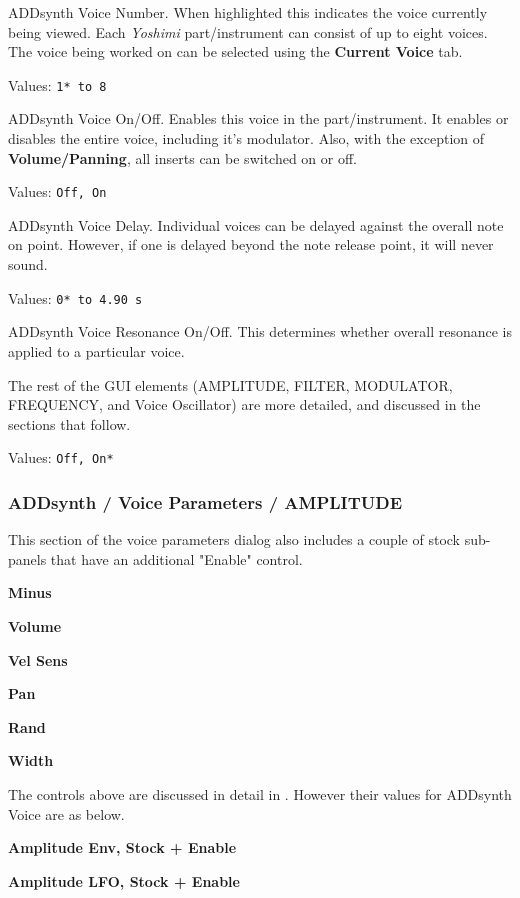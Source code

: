    \setcounter{ItemCounter}{0}      %

   ADDsynth Voice Number.
   When highlighted this indicates the voice currently being viewed.  Each
   \textsl{Yoshimi} part/instrument can consist of up to eight voices. The
   voice being worked on can be selected using the \textbf{Current Voice} tab.

   Values: \texttt{1* to 8}

   ADDsynth Voice On/Off.
   Enables this voice in the part/instrument.
   It enables or disables the entire voice, including it's modulator.
   Also, with the exception of \textbf{Volume/Panning},
   all inserts can be switched on or off.

   Values: \texttt{Off, On}

   ADDsynth Voice Delay.
   Individual voices can be delayed against the overall note on point.
   However, if one is delayed beyond the note release point, it will never sound.

   Values: \texttt{0* to 4.90 s}

   ADDsynth Voice Resonance On/Off.
   This determines whether overall resonance is applied to a particular voice.

   The rest of the GUI elements
   (AMPLITUDE, FILTER, MODULATOR, FREQUENCY, and Voice Oscillator)
   are more detailed, and discussed in the sections that follow.

   Values: \texttt{Off, On*}

\subsubsection{ADDsynth / Voice Parameters / AMPLITUDE}
\label{subsubsec:addsynth_voice_parameters_amplitude}

   This section of the voice parameters dialog also includes a couple of
   stock sub-panels that have an additional "Enable" control.

   \begin{enumber}
      \item \textbf{Minus}
      \item \textbf{Volume}
      \item \textbf{Vel Sens}
      \item \textbf{Pan}
      \item \textbf{Rand}
      \item \textbf{Width}

      The controls above are discussed in detail in
       . However their values for ADDsynth
       Voice are as below.

      \item \textbf{Amplitude Env, Stock + Enable}
      \item \textbf{Amplitude LFO, Stock + Enable}
   \end{enumber}

